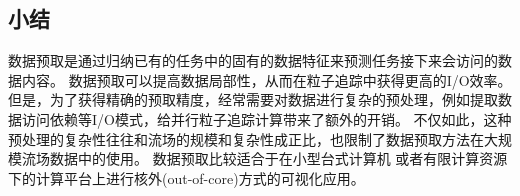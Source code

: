 \subsection{小结}
数据预取是通过归纳已有的任务中的固有的数据特征来预测任务接下来会访问的数据内容。
数据预取可以提高数据局部性，从而在粒子追踪中获得更高的I/O效率。
但是，为了获得精确的预取精度，经常需要对数据进行复杂的预处理，例如提取数据访问依赖等I/O模式，给并行粒子追踪计算带来了额外的开销。
不仅如此，这种预处理的复杂性往往和流场的规模和复杂性成正比，也限制了数据预取方法在大规模流场数据中的使用。
数据预取比较适合于在小型台式计算机\parencite{ChenS13, ChenNLS12, VermaKP00} 或者有限计算资源下的计算平台\parencite{GuoZLLYHMP14}上进行核外(out-of-core)方式的可视化应用。
